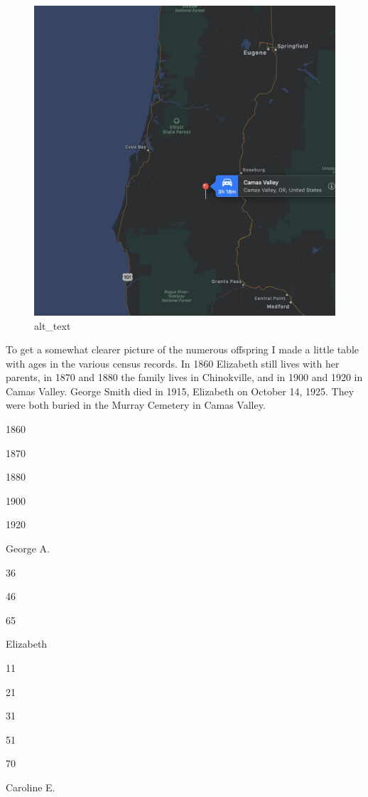 \documentclass[
  12pt,
]{book}
\begin{document}
\begin{figure}
\centering
\includegraphics{images/0203b_images/image1.png}
\caption{alt\_text}
\end{figure}

To get a somewhat clearer picture of the numerous offspring I made a little table with ages in the various census records. In 1860 Elizabeth still lives with her parents, in 1870 and 1880 the family lives in Chinokville, and in 1900 and 1920 in Camas Valley. George Smith died in 1915, Elizabeth on October 14, 1925. They were both buried in the Murray Cemetery in Camas Valley.

1860

1870

1880

1900

1920

George A.

36

46

65

Elizabeth

11

21

31

51

70

Caroline E.
\end{document}
